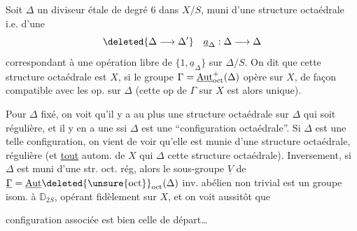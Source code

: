 Soit \(\Delta\) un diviseur étale de degré \(6\) dans \(X/S\), muni d'une structure octaédrale i.e. d'une   
\[
 \deleted{\Delta\longrightarrow\Delta'}\quad \underline{a}_{\Delta}:\Delta\longrightarrow\Delta
\]
 correspondant à une opération libre de \(\{1,\underline{a}_{\Delta}\}\) sur \(\Delta/S\). On dit que cette structure octaédrale est   \(X\), si le groupe \(\Gamma=\underline{\operatorname{Aut}}_{\rm oct}^{+}(\Delta)\) opère sur \(X\), de façon compatible avec les op. sur \(\Delta\) (cette op de \(\Gamma\) sur \(X\) est alors unique).

 Pour \(\Delta\)  fixé, on voit qu'il y a au plus une structure octaédrale sur \(\Delta\) qui soit régulière, et il y en a une ssi \(\Delta\) est une ``configuration octaédrale''. Si \(\Delta\) est une telle configuration, on vient de voir  qu'elle est munie d'une  structure octaédrale, régulière (et \uline{tout} autom. de \(X\) qui   \(\Delta\)   cette structure octaédrale).
Inversement, si \(\Delta\) est muni d'une str. oct. rég, alors le sous-groupe \(\underline V\) de \(\underline\Gamma=\underline{\operatorname{Aut}}\deleted{\unsure{\rm oct}}_{\rm oct}(\Delta)\) inv. abélien non trivial est un groupe  isom. à \(\mathbb D_{2S}\), opérant fidèlement sur \(X\), et on voit aussitôt que 

configuration   associée est bien celle de départ\ldots

